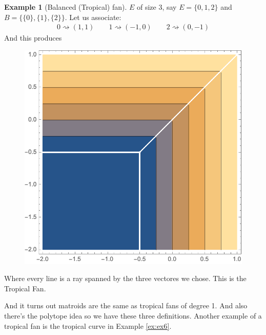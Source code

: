 \documentclass{article}
\theoremstyle{definition}
\newtheorem{ex}{Example}
\begin{document}
\begin{ex}[Balanced (Tropical) fan]
	$E$ of size 3, say $E=\{0,1,2\}$ and $B=\{\{0\},\{1\},\{2\}\}$. Let us associate:
	\begin{align*}
		0\rightsquigarrow(1,1)\qquad 1\rightsquigarrow(-1,0)\qquad 2\rightsquigarrow(0,-1)
	\end{align*}
	And this produces
	\begin{figure}[H]
		\centering
		\includegraphics[width=0.4\linewidth]{11}
		\caption*{}
	\end{figure}
	Where every line is a ray spanned by the three vectores we chose. This is the Tropical Fan.
\end{ex}
And it turns out matroids are the same as tropical fans of degree 1. And also there's the polytope idea so we have these three definitions.
Another example of a tropical fan is the tropical curve in Example \ref{ex:ex6}.
\newpage
\end{document}
